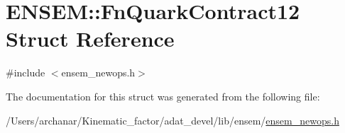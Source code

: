 \hypertarget{structENSEM_1_1FnQuarkContract12}{}\section{E\+N\+S\+EM\+:\+:Fn\+Quark\+Contract12 Struct Reference}
\label{structENSEM_1_1FnQuarkContract12}


{\ttfamily \#include $<$ensem\+\_\+newops.\+h$>$}



The documentation for this struct was generated from the following file\+:\begin{DoxyCompactItemize}
\item 
/\+Users/archanar/\+Kinematic\+\_\+factor/adat\+\_\+devel/lib/ensem/\mbox{\hyperlink{lib_2ensem_2ensem__newops_8h}{ensem\+\_\+newops.\+h}}\end{DoxyCompactItemize}
